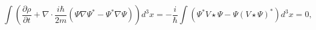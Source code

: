 \begin{equation}
\int\left(  \frac{\partial\rho}{\partial t}+\nabla\cdot\frac{i\hbar}%
{2m}\left(  \Psi\nabla\Psi^{\ast}-\Psi^{\ast}\nabla\Psi\right)  \right)
d^{3}x=-\frac{i}{\hbar}\int\left(  \Psi^{\ast}V\star\Psi-\Psi\left(
V\star\Psi\right)  ^{\ast}\right)  d^{3}x=0,\label{32}%
\end{equation}

